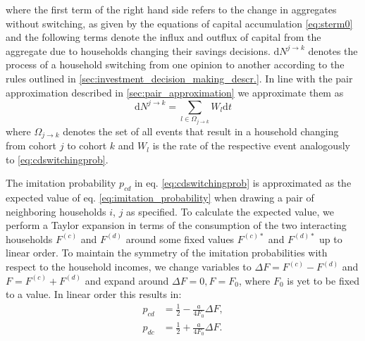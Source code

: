 where the first term of the right hand side refers to the change in aggregates without switching, as given by the equations of capital accumulation \eqref{eq:sterm0} and the following terms denote the influx and outflux of capital from the aggregate due to households changing their savings decisions.
${\mathrm d} N^{j \rightarrow k}$ denotes the process of a household switching from one opinion to another according to the rules outlined in \ref{sec:investment_decision_making_descr.}. In line with the pair approximation described in \ref{sec:pair_approximation} we approximate them as
\begin{equation}
{\mathrm d} N^{j \rightarrow k} = \sum_{l \in \Omega_{j \rightarrow k}}W_l {\mathrm d}t
\end{equation}
where $\Omega_{j \rightarrow k}$ denotes the set of all events that result in a household changing from cohort $j$ to cohort $k$ and $W_l$ is the rate of the respective event analogously to \eqref{eq:cdswitchingprob}.

The imitation probability $p_{cd}$ in eq. \eqref{eq:cdswitchingprob} is approximated as the expected value of eq. \eqref{eq:imitation_probability} when drawing a pair of neighboring households $i$, $j$ as specified. To calculate the expected value, we perform a Taylor expansion in terms of the consumption of the two interacting households $F^{(c)}$ and $F^{(d)}$ around some fixed values $F^{(c)*}$ and $F^{(d)*}$ up to linear order. To maintain the symmetry of the imitation probabilities with respect to the household incomes, we change variables to $\Delta F = F^{(c)} - F^{(d)}$ and $F = F^{(c)} + F^{(d)}$ and expand around $\Delta F = 0, F = F_0$, where $F_0$ is yet to be fixed to a value. In linear order this results in:
\begin{align}
	p_{cd} &= \frac{1}{2} - \frac{a}{4 F_0} \Delta F, \label{eq:approx_p_cd}\\
	p_{dc} &= \frac{1}{2} + \frac{a}{4 F_0} \Delta F. \label{eq:approx_p_dc}
\end{align}

